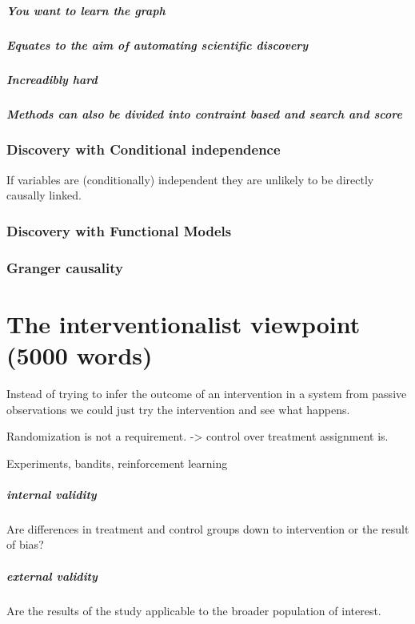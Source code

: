 \documentclass[11pt,a4paper,oneside]{book}
\begin{document}
\paragraph*{You want to learn the graph}
\paragraph*{Equates to the aim of automating scientific discovery}
\paragraph*{Increadibly hard}
\paragraph*{Methods can also be divided into contraint based and search and score}
\subsection*{Discovery with Conditional independence}
If variables are (conditionally) independent they are unlikely to be directly causally linked. 
\subsection*{Discovery with Functional Models}
\subsection*{Granger causality}

\chapter*{The interventionalist viewpoint (5000 words)}

Instead of trying to infer the outcome of an intervention in a system from passive observations we could just try the intervention and see what happens.

Randomization is not a requirement. -> control over treatment assignment is.

Experiments, bandits, reinforcement learning

\paragraph*{internal validity} Are differences in treatment and control groups down to intervention or the result of bias? 

\paragraph*{external validity} Are the results of the study applicable to the broader population of interest.
\end{document}
